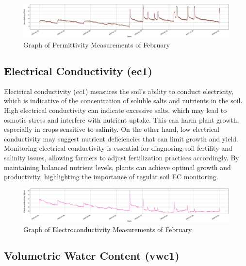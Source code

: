 \begin{figure}[htbp]
    \centering
    \includegraphics[width=15 cm]{4_ChapterMaterials/figuras/train_data_Permittivity.pdf}
    \caption{Graph of Permittivity Measurements of February}
    \end{figure}

\subsection{Electrical Conductivity (ec1)}

Electrical conductivity (\( ec1 \)) measures the soil's ability to conduct electricity, which is indicative of the concentration of soluble salts and nutrients in the soil. High electrical conductivity can indicate excessive salts, which may lead to osmotic stress and interfere with nutrient uptake. This can harm plant growth, especially in crops sensitive to salinity. On the other hand, low electrical conductivity may suggest nutrient deficiencies that can limit growth and yield. Monitoring electrical conductivity is essential for diagnosing soil fertility and salinity issues, allowing farmers to adjust fertilization practices accordingly. By maintaining balanced nutrient levels, plants can achieve optimal growth and productivity, highlighting the importance of regular soil EC monitoring.

\begin{figure}[htbp]
    \centering
    \includegraphics[width=15 cm]{4_ChapterMaterials/figuras/train_data_Electroconductivity.pdf}
    \caption{Graph of Electroconductivity Measurements of February}
    \end{figure}

\subsection{Volumetric Water Content (vwc1)}

